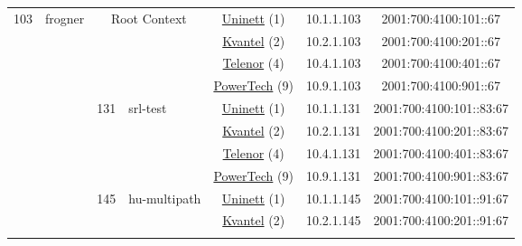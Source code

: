 \begin{small}
\begin{center}
\begin{longtable}{|c|c|c|c|c|c|c|c|}
 \multirow{24}{*}{\tiny{103}} & \multicolumn{1}{|l|}{\multirow{24}{*}{\tiny{frogner}}} & \multicolumn{2}{|c|}{\multirow{4}{*}{\tiny{Root Context}}} & \multicolumn{2}{|c|}{\tiny{\href{https://www.uninett.no}{Uninett} (1)}} & \tiny{10.1.1.103} & \tiny{2001:700:4100:101::67} \\* \cline{5-5}\cline{6-6}\cline{7-7}\cline{8-8}
  &  & \multicolumn{2}{|c|}{} & \multicolumn{2}{|c|}{\tiny{\href{http://kvantel.no}{Kvantel} (2)}} & \tiny{10.2.1.103} & \tiny{2001:700:4100:201::67} \\* \cline{5-5}\cline{6-6}\cline{7-7}\cline{8-8}
  &  & \multicolumn{2}{|c|}{} & \multicolumn{2}{|c|}{\tiny{\href{https://www.telenor.no}{Telenor} (4)}} & \tiny{10.4.1.103} & \tiny{2001:700:4100:401::67} \\* \cline{5-5}\cline{6-6}\cline{7-7}\cline{8-8}
  &  & \multicolumn{2}{|c|}{} & \multicolumn{2}{|c|}{\tiny{\href{http://www.powertech.no}{PowerTech} (9)}} & \tiny{10.9.1.103} & \tiny{2001:700:4100:901::67} \\* \cline{3-3}\cline{4-4}\cline{5-5}\cline{6-6}\cline{7-7}\cline{8-8}
  &  & \multirow{4}{*}{\tiny{131}} & \multicolumn{1}{|l|}{\multirow{4}{*}{\tiny{srl-test}}} & \multicolumn{2}{|c|}{\tiny{\href{https://www.uninett.no}{Uninett} (1)}} & \tiny{10.1.1.131} & \tiny{2001:700:4100:101::83:67} \\* \cline{5-5}\cline{6-6}\cline{7-7}\cline{8-8}
  &  &  &  & \multicolumn{2}{|c|}{\tiny{\href{http://kvantel.no}{Kvantel} (2)}} & \tiny{10.2.1.131} & \tiny{2001:700:4100:201::83:67} \\* \cline{5-5}\cline{6-6}\cline{7-7}\cline{8-8}
  &  &  &  & \multicolumn{2}{|c|}{\tiny{\href{https://www.telenor.no}{Telenor} (4)}} & \tiny{10.4.1.131} & \tiny{2001:700:4100:401::83:67} \\* \cline{5-5}\cline{6-6}\cline{7-7}\cline{8-8}
  &  &  &  & \multicolumn{2}{|c|}{\tiny{\href{http://www.powertech.no}{PowerTech} (9)}} & \tiny{10.9.1.131} & \tiny{2001:700:4100:901::83:67} \\* \cline{3-3}\cline{4-4}\cline{5-5}\cline{6-6}\cline{7-7}\cline{8-8}
  &  & \multirow{4}{*}{\tiny{145}} & \multicolumn{1}{|l|}{\multirow{4}{*}{\tiny{hu-multipath}}} & \multicolumn{2}{|c|}{\tiny{\href{https://www.uninett.no}{Uninett} (1)}} & \tiny{10.1.1.145} & \tiny{2001:700:4100:101::91:67} \\* \cline{5-5}\cline{6-6}\cline{7-7}\cline{8-8}
  &  &  &  & \multicolumn{2}{|c|}{\tiny{\href{http://kvantel.no}{Kvantel} (2)}} & \tiny{10.2.1.145} & \tiny{2001:700:4100:201::91:67} \\* \cline{5-5}\cline{6-6}\cline{7-7}\cline{8-8}

\end{longtable}
\end{center}
\end{small}
